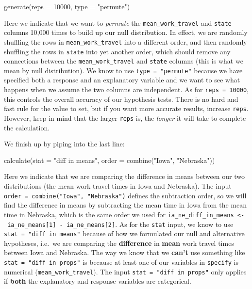 \documentclass[
]{book}
\newenvironment{Shaded}{\begin{snugshade}}{\end{snugshade}}
\newcommand{\AttributeTok}[1]{\textcolor[rgb]{0.77,0.63,0.00}{#1}}
\newcommand{\DecValTok}[1]{\textcolor[rgb]{0.00,0.00,0.81}{#1}}
\newcommand{\FunctionTok}[1]{\textcolor[rgb]{0.00,0.00,0.00}{#1}}
\newcommand{\NormalTok}[1]{#1}
\newcommand{\StringTok}[1]{\textcolor[rgb]{0.31,0.60,0.02}{#1}}
\begin{document}
\begin{Shaded}
\begin{Highlighting}[]
\FunctionTok{generate}\NormalTok{(}\AttributeTok{reps =} \DecValTok{10000}\NormalTok{, }\AttributeTok{type =} \StringTok{"permute"}\NormalTok{)}
\end{Highlighting}
\end{Shaded}

Here we indicate that we want to \emph{permute} the \texttt{mean\_work\_travel} and \texttt{state} columns 10,000 times to build up our null distribution.
In effect, we are randomly shuffling the rows in \texttt{mean\_work\_travel} into a different order, and then randomly shuffling the rows in \texttt{state} into yet another order, which should remove any connections between the \texttt{mean\_work\_travel} and \texttt{state} columns (this is what we mean by null distribution).
We know to use \texttt{type\ =\ "permute"} because we have specified both a response and an explanatory variable and we want to see what happens when we assume the two columns are independent.
As for \texttt{reps\ =\ 10000}, this controls the overall accuracy of our hypothesis tests.
There is no hard and fast rule for the value to set, but if you want more accurate results, increase \texttt{reps}.
However, keep in mind that the larger \texttt{reps} is, the \emph{longer} it will take to complete the calculation.

We finish up by piping into the last line:

\begin{Shaded}
\begin{Highlighting}[]
\FunctionTok{calculate}\NormalTok{(}\AttributeTok{stat =} \StringTok{"diff in means"}\NormalTok{, }\AttributeTok{order =} \FunctionTok{combine}\NormalTok{(}\StringTok{"Iowa"}\NormalTok{, }\StringTok{"Nebraska"}\NormalTok{))}
\end{Highlighting}
\end{Shaded}

Here we indicate that we are comparing the difference in means between our two distributions (the mean work travel times in Iowa and Nebraska).
The input \texttt{order\ =\ combine("Iowa",\ "Nebraska")} defines the subtraction order, so we will find the difference in means by subtracting the mean time in Iowa from the mean time in Nebraska, which is the same order we used for \texttt{ia\_ne\_diff\_in\_means\ \textless{}-\ ia\_ne\_means{[}1{]}\ -\ ia\_ne\_means{[}2{]}}.
As for the \texttt{stat} input, we know to use \texttt{stat\ =\ "diff\ in\ means"} because of how we formulated our null and alternative hypotheses, i.e.~we are comparing the \textbf{difference} in \textbf{mean} work travel times between Iowa and Nebraska.
The way we know that we \textbf{can't} use something like \texttt{stat\ =\ "diff\ in\ props"} is because at least one of our variables in \texttt{specify} is numerical (\texttt{mean\_work\_travel}).
The input \texttt{stat\ =\ "diff\ in\ props"} only applies if \textbf{both} the explanatory and response variables are categorical.
\end{document}
